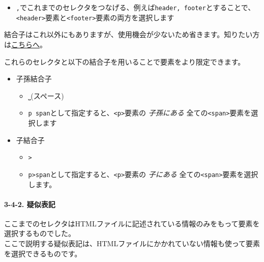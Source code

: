 \begin{itemize}
  \begin{itemize}
  \tightlist
  \item
    \texttt{,}でこれまでのセレクタをつなげる、例えば\texttt{header,\ footer}とすることで、\texttt{\textless{}header\textgreater{}}要素と\texttt{\textless{}footer\textgreater{}}要素の両方を選択します
  \end{itemize}
\end{itemize}

結合子はこれ以外にもありますが、使用機会が少ないため省きます。知りたい方は\href{https://developer.mozilla.org/ja/docs/Web/CSS/CSS_selectors\#\%E7\%B5\%90\%E5\%90\%88\%E5\%AD\%90}{こちらへ}。

これらのセレクタと以下の結合子を用いることで要素をより限定できます。

\begin{itemize}
\tightlist
\item
  子孫結合子

  \begin{itemize}
  \tightlist
  \item
    \texttt{⎵}(スペース)
  \item
    \texttt{p\ span}として指定すると、\texttt{\textless{}p\textgreater{}}要素の
    \emph{子孫にある}
    全ての\texttt{\textless{}span\textgreater{}}要素を選択します
  \end{itemize}
\item
  子結合子

  \begin{itemize}
  \tightlist
  \item
    \texttt{\textgreater{}}
  \item
    \texttt{p\textgreater{}span}として指定すると、\texttt{\textless{}p\textgreater{}}要素の
    \emph{子にある}
    全ての\texttt{\textless{}span\textgreater{}}要素を選択します。
  \end{itemize}
\end{itemize}

\paragraph{3-4-2. 疑似表記}\label{ux7591ux4f3cux8868ux8a18}

ここまでのセレクタはHTMLファイルに記述されている情報のみをもって要素を選択するものでした。\\
ここで説明する疑似表記は、HTMLファイルにかかれていない情報も使って要素を選択できるものです。

